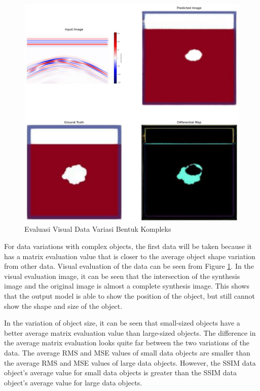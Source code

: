 \documentclass[conference]{IEEEtran}
\begin{document}
\begin{figure}[ht]
  \centering
  \includegraphics[scale=0.15]{gambar/diffMapKompleks.jpg}
  \caption{Evaluasi Visual Data Variasi Bentuk Kompleks}
  \label{fig:diffmapkompleks}
\end{figure}

For data variations with complex objects, the first data will be taken because it has a matrix evaluation value that is closer to the average object shape variation from other data.
Visual evaluation of the data can be seen from Figure \ref{fig:diffmapkompleks}.
In the visual evaluation image, it can be seen that the intersection of the synthesis image and the original image is almost a complete synthesis image.
This shows that the output model is able to show the position of the object, but still cannot show the shape and size of the object.

In the variation of object size, it can be seen that small-sized objects have a better average matrix evaluation value than large-sized objects.
The difference in the average matrix evaluation looks quite far between the two variations of the data.
The average RMS and MSE values of small data objects are smaller than the average RMS and MSE values of large data objects.
However, the SSIM data object's average value for small data objects is greater than the SSIM data object's average value for large data objects.
\end{document}

